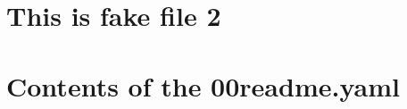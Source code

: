 \documentclass{article}
\begin{document}
\section*{This is fake file 2}

\section*{Contents of the 00readme.yaml}

\end{document}
